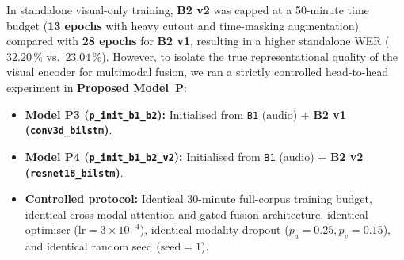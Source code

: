 \documentclass[11pt,a4paper]{article}
\newcommand{\code}[1]{\texttt{\small #1}}
\begin{document}
In standalone visual-only training, \textbf{B2 v2} was capped at a 50-minute time budget (\textbf{13 epochs} with heavy cutout and time-masking augmentation) compared with \textbf{28 epochs} for \textbf{B2 v1}, resulting in a higher standalone WER ($32.20\,\%$ vs.\ $23.04\,\%$). However, to isolate the true representational quality of the visual encoder for multimodal fusion, we ran a strictly controlled head-to-head experiment in \textbf{Proposed Model~P}:
\begin{itemize}
  \item \textbf{Model P3 (\code{p\_init\_b1\_b2}):} Initialised from \code{B1} (audio) + \textbf{B2 v1 (\code{conv3d\_bilstm})}.
  \item \textbf{Model P4 (\code{p\_init\_b1\_b2\_v2}):} Initialised from \code{B1} (audio) + \textbf{B2 v2 (\code{resnet18\_bilstm})}.
  \item \textbf{Controlled protocol:} Identical 30-minute full-corpus training budget, identical cross-modal attention and gated fusion architecture, identical optimiser ($\text{lr}=3{\times}10^{-4}$), identical modality dropout ($p_a=0.25, p_v=0.15$), and identical random seed ($\text{seed}=1$).
\end{itemize}
\end{document}
